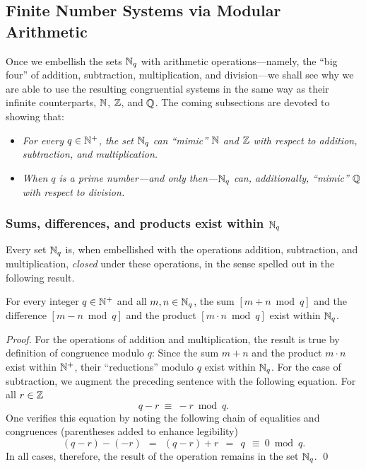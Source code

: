 \subsection{Finite Number Systems via Modular Arithmetic}
\label{sec:modular}

Once we embellish the sets $\mathbb{N}_q$ with arithmetic operations---namely, the ``big four'' of addition, subtraction, multiplication, and division---we shall see why we are able to use the resulting
congruential systems in the same way as their infinite counterparts, $\mathbb{N}$, $\mathbb{Z}$, and $\mathbb{Q}$.  The coming subsections are devoted to showing that:
\begin{itemize}
\item
{\em For every $q \in \mathbb{N}^+$, the set $\mathbb{N}_q$ can ``mimic'' $\mathbb{N}$ and $\mathbb{Z}$ with respect to addition, subtraction, and multiplication.}
\medskip\item
{\em When $q$ is a prime number---and only then---$\mathbb{N}_q$ can, additionally, ``mimic'' $\mathbb{Q}$ with respect to division.}
\end{itemize}

\subsubsection{Sums, differences, and products exist within $\mathbb{N}_q$}
\label{sec:modular-add-sub-mult}


Every set $\mathbb{N}_q$ is, when embellished with the operations addition, subtraction, and multiplication, {\em closed} under these operations, in the sense spelled out in the following result.

\begin{prop}
\label{thm:modular-add-sub-mult}
For every integer $q \in \mathbb{N}^+$ and all $m,n \in \mathbb{N}_q$, the sum $[m+n \bmod q]$ and the difference $[m-n \bmod q]$ and the product $[m \cdot n \bmod q]$ exist within $\mathbb{N}_q$.
\end{prop}

\begin{proof}
For the operations of addition and multiplication, the result is true by definition of congruence modulo $q$:  Since the sum $m+n$ and the product $m \cdot n$ exist within $\mathbb{N}^+$, their ``reductions'' modulo $q$ exist within $\mathbb{N}_q$.  For the case of subtraction, we augment the
preceding sentence with the following equation.  For all $r \in \mathbb{Z}$
\[ q-r \ \equiv \ -r \bmod q. \]
One verifies this equation by noting the following chain of equalities and congruences (parentheses added to enhance legibility)
\[ (q-r) - (-r) \ \ = \ \ (q-r) + r \ \ = \ \ q \ \ \equiv \ 0 \bmod q. \] 
In all cases, therefore, the result of the operation remains in the set $\mathbb{N}_q$.
\qed
\end{proof}

